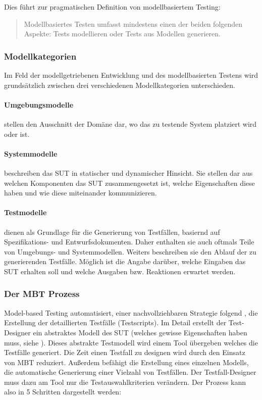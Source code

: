 Dies führt zur pragmatischen Definition von modellbasiertem Testing:

\begin{quote}
Modellbasiertes Testen umfasst mindestens einen der beiden folgenden Aspekte: Tests modellieren oder Tests aus Modellen generieren.
\end{quote}


\subsubsection{Modellkategorien}
Im Feld der modellgetriebenen Entwicklung und des modellbasierten Testens wird grundsätzlich zwischen drei verschiedenen Modellkategorien unterschieden.

\paragraph{Umgebungsmodelle} stellen den Ausschnitt der Domäne dar, wo das zu testende System platziert wird oder ist.
\paragraph{Systemmodelle} beschreiben das SUT in statischer und dynamischer Hinsicht. Sie stellen dar aus welchen Komponenten das SUT zusammengesetzt ist, welche Eigenschaften diese haben und wie diese miteinander kommunizieren. 
\paragraph{Testmodelle} dienen als Grundlage für die Generierung von Testfällen, basiernd auf Spezifikations- und Entwurfsdokumenten. Daher enthalten sie auch oftmals Teile von Umgebungs- und Systemmodellen. Weiters beschreiben sie den Ablauf der zu generierenden Testfälle. Möglich ist die Angabe darüber, welche Eingaben das SUT erhalten soll und welche Ausgaben bzw. Reaktionen erwartet werden.

\subsubsection{Der MBT Prozess}
Model-based Testing automatisiert, einer nachvollziehbaren Strategie folgend , die Erstellung der detaillierten Testfälle (Testscripts).
Im Detail erstellt der Test-Designer ein abstraktes Modell des SUT (welches gewisse Eigenschaften haben muss, siehe ). Dieses abstrakte Testmodell wird einem Tool übergeben welches die Testfälle generiert. Die Zeit einen Testfall zu designen wird durch den Einsatz von MBT reduziert. Außerdem befähigt die Erstellung eines einzelnen Modells, die automatische Generierung einer Vielzahl von Testfällen. Der Testfall-Designer muss dazu am Tool nur die Testauswahlkriterien verändern. \cite{utting_practical_2007} Der Prozess kann also in 5 Schritten dargestellt werden:

